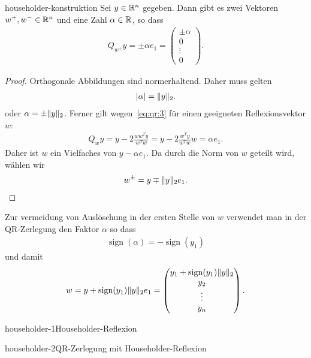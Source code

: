 \begin{Lemma}{householder-konstruktion}
  Sei $y\in\mathbb R^n$ gegeben. Dann gibt es zwei Vektoren $w^+,w^-\in\mathbb R^n$
  und eine Zahl $\alpha\in \mathbb R$, so dass
  \begin{gather}
    \label{eq:qr:3}
    Q_{w^\pm} y = \pm \alpha e_1 =
    \begin{pmatrix}
      \pm \alpha\\0\\\vdots\\0
    \end{pmatrix}.
  \end{gather}
\end{Lemma}

\begin{proof}
  Orthogonale Abbildungen sind normerhaltend. Daher muss gelten
  \begin{gather}
    \lvert\alpha\rvert = \lVert y\rVert_2.
  \end{gather}
  oder $\alpha = \pm\lVert y\rVert_2$.  Ferner gilt
  wegen~\eqref{eq:qr:3} für einen geeigneten Reflexionsvektor $w$:
  \begin{gather}
    Q_{w} y = y-2 \frac{ww^Ty}{w^Tw} = y-2\frac{w^Ty}{w^Tw}w = \alpha e_1.
  \end{gather}
  Daher ist $w$ ein Vielfaches von $y - \alpha e_1$. Da durch die Norm
  von $w$ geteilt wird, wählen wir
  \begin{gather}
    w^{\pm} = y\mp \lVert y\rVert_2 e_1.
  \end{gather}
\end{proof}

\begin{remark}
  Zur vermeidung von Auslöschung in der ersten Stelle von $w$
  verwendet man in der QR-Zerlegung den Faktor $\alpha$ so dass
  \begin{gather}
    \operatorname{sign} (\alpha) = -\operatorname{sign} (y_1)
  \end{gather}
  und damit
  \begin{gather}
    w = y + \operatorname{sign} (y_1) \lVert y\rVert_2 e_1
    =
    \begin{pmatrix}
      y_1 + \operatorname{sign} (y_1) \lVert y\rVert_2\\
      y_2\\\vdots\\y_n
    \end{pmatrix}.
  \end{gather}
\end{remark}

\begin{Algorithmus*}{householder-1}{Householder-Reflexion}
  
\end{Algorithmus*}

\begin{Algorithmus*}{householder-2}{QR-Zerlegung mit Householder-Reflexion}
  
\end{Algorithmus*}


